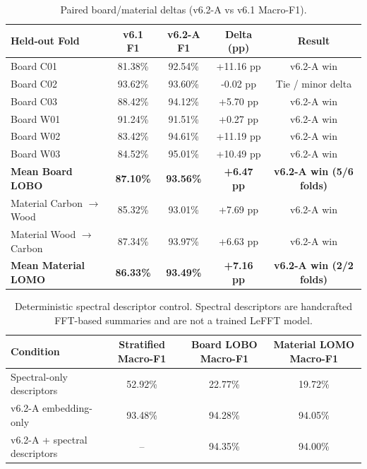 \documentclass[review,3p,times]{elsarticle}
\begin{document}
\begin{table}[htbp]
\centering
\caption{Paired board/material deltas (v6.2-A vs v6.1 Macro-F1).}
\label{tab:s5}
\begin{tabular}{lcccc}
\toprule
\textbf{Held-out Fold} & \textbf{v6.1 F1} & \textbf{v6.2-A F1} & \textbf{Delta (pp)} & \textbf{Result} \\
\midrule
Board C01 & 81.38\% & 92.54\% & +11.16 pp & v6.2-A win \\
Board C02 & 93.62\% & 93.60\% & -0.02 pp & Tie / minor delta \\
Board C03 & 88.42\% & 94.12\% & +5.70 pp & v6.2-A win \\
Board W01 & 91.24\% & 91.51\% & +0.27 pp & v6.2-A win \\
Board W02 & 83.42\% & 94.61\% & +11.19 pp & v6.2-A win \\
Board W03 & 84.52\% & 95.01\% & +10.49 pp & v6.2-A win \\
\textbf{Mean Board LOBO} & \textbf{87.10\%} & \textbf{93.56\%} & \textbf{+6.47 pp} & \textbf{v6.2-A win (5/6 folds)} \\
\midrule
Material Carbon $\rightarrow$ Wood & 85.32\% & 93.01\% & +7.69 pp & v6.2-A win \\
Material Wood $\rightarrow$ Carbon & 87.34\% & 93.97\% & +6.63 pp & v6.2-A win \\
\textbf{Mean Material LOMO} & \textbf{86.33\%} & \textbf{93.49\%} & \textbf{+7.16 pp} & \textbf{v6.2-A win (2/2 folds)} \\
\bottomrule
\end{tabular}
\end{table}

\begin{table}[htbp]
\centering
\caption{Deterministic spectral descriptor control. Spectral descriptors are handcrafted FFT-based summaries and are not a trained LeFFT model.}
\label{tab:spectral_control}
\begin{tabular}{lccc}
\toprule
Condition & Stratified Macro-F1 & Board LOBO Macro-F1 & Material LOMO Macro-F1 \\
\midrule
Spectral-only descriptors & 52.92\% & 22.77\% & 19.72\% \\
v6.2-A embedding-only & 93.48\% & 94.28\% & 94.05\% \\
v6.2-A + spectral descriptors & -- & 94.35\% & 94.00\% \\
\bottomrule
\end{tabular}
\end{table}
\end{document}
